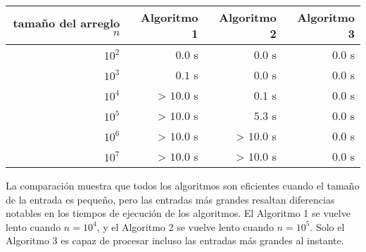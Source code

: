 \begin{center}
    \begin{tabular}{rrrr}
        tamaño del arreglo $n$ & Algoritmo 1 & Algoritmo 2 & Algoritmo 3 \\
        \hline
        $10^2$                 & $0.0$ s     & $0.0$ s     & $0.0$ s     \\
        $10^3$                 & $0.1$ s     & $0.0$ s     & $0.0$ s     \\
        $10^4$                 & > $10.0$ s  & $0.1$ s     & $0.0$ s     \\
        $10^5$                 & > $10.0$ s  & $5.3$ s     & $0.0$ s     \\
        $10^6$                 & > $10.0$ s  & > $10.0$ s  & $0.0$ s     \\
        $10^7$                 & > $10.0$ s  & > $10.0$ s  & $0.0$ s     \\
    \end{tabular}
\end{center}

La comparación muestra que todos los algoritmos
son eficientes cuando el tamaño de la entrada es pequeño,
pero las entradas más grandes resaltan diferencias notables
en los tiempos de ejecución de los algoritmos.
El Algoritmo 1 se vuelve lento
cuando $n=10^4$, y el Algoritmo 2
se vuelve lento cuando $n=10^5$.
Solo el Algoritmo 3 es capaz de procesar
incluso las entradas más grandes al instante.
